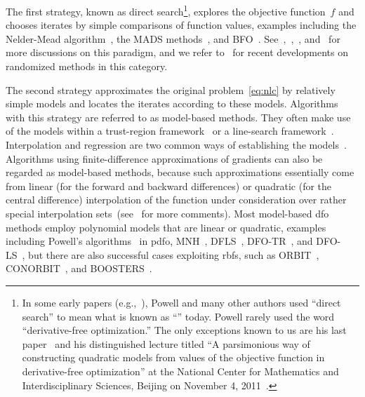 \documentclass[
    smallextended,  %
    final,        %
]{svjour3}
\newcommand{\obj}{f}
\begin{document}
The first strategy, known as direct search\footnote{In some early papers (e.g.,~\cite{Powell_1994,Powell_1998}),
Powell and many other authors used ``direct search'' to mean what is known as ``'' today. Powell rarely used the word ``derivative-free optimization.''
The only exceptions known to us are his last paper~\cite{Powell_2015} and his distinguished lecture
titled ``A parsimonious way of constructing quadratic models from values of the objective function in
derivative-free optimization'' at the National Center for Mathematics and Interdisciplinary Sciences,
Beijing on November 4, 2011~\cite{Buhmann_Fletcher_Iserles_Toint_2018}.}, explores the objective function~$\obj$ and chooses iterates by simple comparisons of function values, examples including the Nelder-Mead algorithm~\cite{Nelder_Mead_1965}, the MADS methods~\cite{Audet_Dennis_2006,Abramson_Audet_2006,Digabel_2011}, and BFO~\cite{Porcelli_Toint_2017,Porcelli_Toint_2020,Porcelli_Toint_2022}.
See~\cite{Kolda_Lewis_Torczon_2003},~\cite[Chapters~7 and~8]{Conn_Scheinberg_Vicente_2009b},~\cite[Part~3]{Audet_Hare_2017}, and~\cite[\S~2.1]{Larson_Menickelly_Wild_2019} for more discussions on this paradigm, and we refer to~\cite{Gratton_Etal_2015,Gratton_Etal_2019} for recent developments on randomized methods in this category.

The second strategy approximates the original problem~\eqref{eq:nlc} by relatively simple models and locates the iterates according to these models.
Algorithms with this strategy are referred to as model-based methods. They often make use of the models within a trust-region framework~\cite{Conn_Gould_Toint_2000,Conn_Scheinberg_Vicente_2009a,Yuan_2015} or a line-search framework~\cite{Berahas_Byrd_Nocedal_2019,Shi_Etal_2022}.
Interpolation and regression are two common ways of establishing the models~\cite{Powell_2001,Conn_Scheinberg_Vicente_2008a,Conn_Scheinberg_Vicente_2008b,Wild_Regis_Shoemaker_2008,Bandeira_Scheinberg_Vicente_2012,Billups_Larson_Graf_2013,Regis_Wild_2017}.
Algorithms using finite-difference approximations of gradients can also be regarded as model-based
methods, because such approximations essentially come from linear (for the forward and backward
differences) or quadratic (for the central difference) interpolation of the function under
consideration over rather special interpolation sets~(see~\cite[\S~1.4.3]{Ragonneau_2022} for more comments).
Most model-based \gls{dfo} methods employ polynomial models that are linear or quadratic, examples including
Powell's algorithms~\cite{Powell_1994,Powell_2002,Powell_2006,Powell_2009} in \gls{pdfo},
MNH~\cite{Wild_2008}, DFLS~\cite{Zhang_Conn_Scheinberg_2010},
DFO-TR~\cite{Bandeira_Scheinberg_Vicente_2012}, and DFO-LS~\cite{Cartis_Etal_2019,Hough_Roberts_2022}, but there are also successful cases exploiting \glspl{rbf}, such as ORBIT~\cite{Wild_Regis_Shoemaker_2008}, CONORBIT~\cite{Regis_Wild_2017}, and BOOSTERS~\cite{Oeuvray_Bierlaire_2009}.
\end{document}
